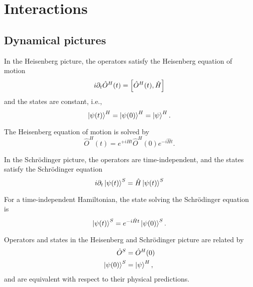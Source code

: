 \section{Interactions}

\subsection{Dynamical pictures}

\begin{definition}
	In the Heisenberg picture, the operators satisfy the Heisenberg equation of motion
	\begin{equation}
		i\partial_t
		\hat{O}^H(t)
		=
		\comm{\hat{O}^H(t)}{\hat{H}}
	\end{equation}
	and the states are constant, i.e.,
	\begin{equation}
		\ket{\psi(t)}^H
		=
		\ket{\psi(0)}^H
		=
		\ket{\psi}^H
		.
	\end{equation}
\end{definition}
\begin{lemma}\label{thm:heisenberg_eom_sol}
	The Heisenberg equation of motion is solved by
	\begin{equation}
		\hat{O}^H(t)
		=
		e^{+i\hat{H}t}
		\hat{O}^H(0)
		e^{-i\hat{H}t}
		.
	\end{equation}
\end{lemma}
\begin{definition}
	In the Schrödinger picture, the operators are time-independent, and the states satisfy the Schrödinger equation
	\begin{equation}
		i\partial_t
		\ket{\psi(t)}^S
		=
		\hat{H}
		\ket{\psi(t)}^S
	\end{equation}
\end{definition}
\begin{lemma}\label{thm:schroedinger_eom_sol}
	For a time-independent Hamiltonian, the state solving the Schrödinger equation is
	\begin{equation}
		\ket{\psi(t)}^S
		=
		e^{-i\hat{H}t}
		\ket{\psi(0)}^S
		.
	\end{equation}
\end{lemma}
\begin{theorem}\label{thm:heisenberg_schroedinger_equivalence}
	Operators and states in the Heisenberg and Schrödinger picture are related by
	\begin{align}
		\hat{O}^S
		&=
		\hat{O}^H(0)
		\\
		\ket{\psi(0)}^S
		&=
		\ket{\psi}^H
		,
	\end{align}
	and are equivalent with respect to their physical predictions.
\end{theorem}
